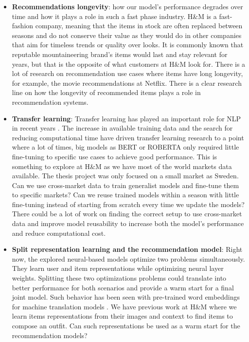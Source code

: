 \documentclass{kththesis}
\begin{document}
\begin{itemize}
    \item \textbf{Recommendations longevity}: how our model's performance degrades over time and how it plays a role in such a fast phase industry. H\&M is a fast-fashion company, meaning that the items in stock are often replaced between seasons and do not conserve their value as they would do in other companies that aim for timeless trends or quality over looks. It is commonly known that reputable mountaineering brand's items would last and stay relevant for years, but that is the opposite of what customers at H\&M look for. There is a lot of research on recommendation use cases where items have long longevity, for example, the movie recommendations at Netflix. There is a clear research line on how the longevity of recommended items plays a role in recommendation systems.
    
    \item \textbf{Transfer learning}: Transfer learning has played an important role for NLP in recent years \cite{ruder2019transfer}. The increase in available training data and the search for reducing computational time have driven transfer learning research to a point where a lot of times, big models as BERT or ROBERTA only required little fine-tuning to specific use cases to achieve good performance. This is something to explore at H\&M as we have most of the world markets data available. The thesis project was only focused on a small market as Sweden. Can we use cross-market data to train generalist models and fine-tune them to specific markets? Can we reuse trained models within a season with little fine-tuning instead of starting from scratch every time we update the models? There could be a lot of work on finding the correct setup to use cross-market data and improve model reusability to increase both the model's performance and reduce computational cost.
    
    \item \textbf{ Split representation learning and the recommendation model}: Right now, the explored neural-based models optimize two problems simultaneously. They learn user and item representations while optimizing neural layer weights. Splitting these two optimizations problems could translate into better performance for both scenarios and provide a warm start for a final joint model. Such behavior has been seen with pre-trained word embeddings for machine translation models \cite{glove}. We have previous work at H\&M \cite{hm2vec} where we learn items representations from their images and context to find items to compose an outfit. Can such representations be used as a warm start for the recommendation models?
    

\end{itemize}
\end{document}
